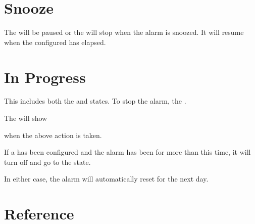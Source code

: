 \section{Snooze} \label{Alarm - Snooze} 

The  will be paused or the  will stop when the alarm is snoozed.
It will resume when the configured  has elapsed.


\section{In Progress} \label{Alarm - In Progress} 

This includes both the  and  states.  To stop the alarm,
 the .

\par\medskip

The  will show

\begin{figure}[H]
\centering
\end{figure}

when the above action is taken.


If a  has been configured and the alarm has been  for
more than this time, it will turn off and go to the  state.


In either case, the alarm will automatically reset for the next day.

\section{Reference} \label{Alarm - Reference}

